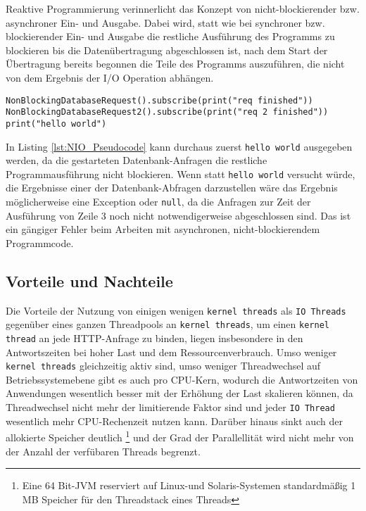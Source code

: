 Reaktive Programmierung verinnerlicht das Konzept von nicht-blockierender bzw. asynchroner Ein- und Ausgabe.
Dabei wird, statt wie bei synchroner bzw. blockierender Ein- und Ausgabe die restliche Ausführung des Programms
zu blockieren bis die Datenübertragung abgeschlossen ist, nach dem Start der Übertragung bereits begonnen die Teile des
Programms auszuführen, die nicht von dem Ergebnis der I/O Operation abhängen.

\begin{lstlisting}[caption=Pseudocode Nonblocking I/O (NIO), captionpos=b, label=lst:NIO_Pseudocode]
NonBlockingDatabaseRequest().subscribe(print("req finished"))
NonBlockingDatabaseRequest2().subscribe(print("req 2 finished"))
print("hello world")
\end{lstlisting}
In Listing \ref{lst:NIO_Pseudocode} kann durchaus zuerst \verb|hello world| ausgegeben werden, da die gestarteten Datenbank-Anfragen die
restliche Programmausführung nicht blockieren. Wenn statt \verb|hello world| versucht würde, die Ergebnisse einer der Datenbank-Abfragen
darzustellen wäre das Ergebnis möglicherweise eine Exception oder \verb|null|, da die Anfragen zur Zeit der Ausführung von Zeile 3 noch nicht notwendigerweise
abgeschlossen sind. Das ist ein gängiger Fehler beim Arbeiten mit asynchronen, nicht-blockierendem Programmcode.

\subsection{Vorteile und Nachteile}
\label{subsec:vorteile_nachteile}

Die Vorteile der Nutzung von einigen wenigen \verb|kernel threads| als \verb|IO Threads| gegenüber eines ganzen Threadpools
an \verb|kernel threads|, um einen \verb|kernel thread| an jede HTTP-Anfrage zu binden, liegen insbesondere in den Antwortszeiten bei
hoher Last und dem Ressourcenverbrauch.
Umso weniger \verb|kernel threads| gleichzeitig aktiv sind, umso weniger Threadwechsel auf Betriebssystemebene
gibt es auch pro CPU-Kern, wodurch die Antwortzeiten von Anwendungen wesentlich besser mit der Erhöhung der Last skalieren können,
da Threadwechsel nicht mehr der limitierende Faktor sind und jeder \verb|IO Thread| wesentlich mehr CPU-Rechenzeit nutzen kann.
Darüber hinaus sinkt auch der allokierte Speicher deutlich
\footnote{Eine 64 Bit-JVM reserviert auf Linux-und Solaris-Systemen standardmäßig 1 MB Speicher für den Threadstack eines Threads}
und der Grad der Parallellität wird nicht mehr von der Anzahl der verfübaren Threads begrenzt.


